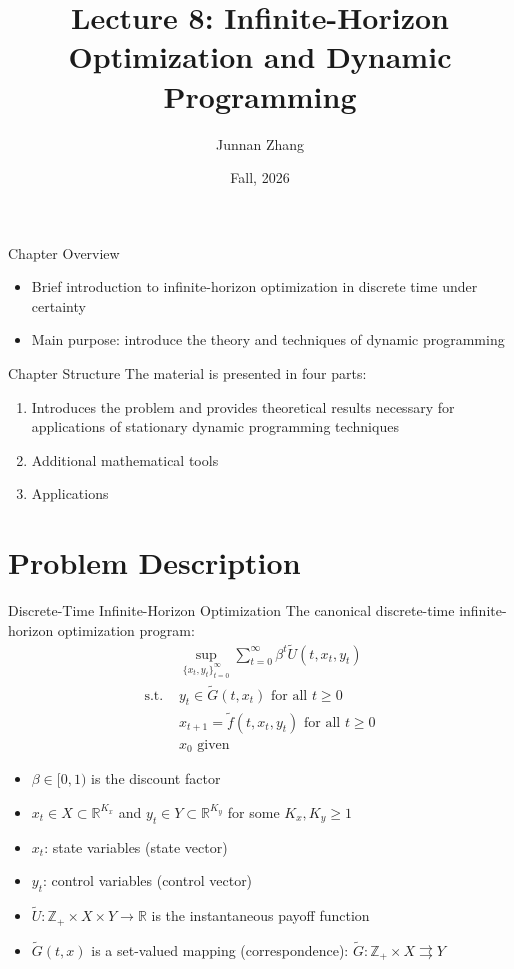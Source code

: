 \documentclass[9pt,aspectratio=169]{beamer}
\title{Lecture 8: Infinite-Horizon Optimization and Dynamic Programming}
\date{}
\author{Junnan Zhang} %
\institute[Paula and Gregory Chow Institute for Studies in Economics\\
Xiamen University] %
{
	Paula and Gregory Chow Institute for Studies in Economics \\ Xiamen University  \\ %
	\medskip
}
\date{Fall, 2026} %
\newcommand{\R}{\mathbb{R}}
\newcommand{\Z}{\mathbb{Z}}
\begin{document}
\frame{\titlepage}

\begin{frame}{Chapter Overview}
    \begin{itemize}
        \item Brief introduction to infinite-horizon optimization in discrete
        time under certainty
        \item Main purpose: introduce the theory and techniques of dynamic
        programming
    \end{itemize}
\end{frame}

\begin{frame}{Chapter Structure}
The material is presented in four parts:
\begin{enumerate}
    \item Introduces the problem and provides theoretical results necessary for
    applications of stationary dynamic programming techniques
    \item Additional mathematical tools
    \item Applications
\end{enumerate}
\end{frame}

\section{Problem Description}

\begin{frame}{Discrete-Time Infinite-Horizon Optimization}
The canonical discrete-time infinite-horizon optimization program:
\begin{align*}
&\sup_{\{x_t,y_t\}_{t=0}^{\infty}} \sum_{t=0}^{\infty} \beta^t \tilde{U}(t, x_t, y_t)\\
\text{s.t. }
&y_t \in \tilde{G}(t, x_t) \text{ for all } t \geq 0\\
&x_{t+1} = \tilde{f}(t, x_t, y_t) \text{ for all } t \geq 0\\
&x_0 \text{ given}
\end{align*}
\small
\begin{itemize}
    \item $\beta \in [0,1)$ is the discount factor
    \item $x_t \in X \subset \R^{K_x}$ and $y_t \in Y \subset \R^{K_y}$ for some $K_x, K_y \geq 1$
    \item $x_t$: state variables (state vector)
    \item $y_t$: control variables (control vector)
    \item $\tilde{U}: \Z_+ \times X \times Y \to \R$ is the instantaneous payoff function
    \item $\tilde{G}(t,x)$ is a set-valued mapping (correspondence): $\tilde{G}: \Z_+ \times X \rightrightarrows Y$
\end{itemize}
\end{frame}
\end{document}
